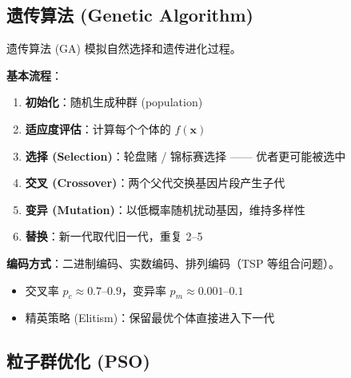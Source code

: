 \documentclass[11pt, aspectratio=169, svgnames, table, fontset=fandol]{ctexbeamer}
\begin{document}
\subsection{遗传算法 (Genetic Algorithm)}

\begin{frame}{遗传算法 (GA)}
  模拟自然选择和遗传进化过程。

  \vspace{4pt}
  \textbf{基本流程}：
  \begin{enumerate}
    \item \textbf{初始化}：随机生成种群 (population)
    \item \textbf{适应度评估}：计算每个个体的 $f(\bm{x})$
    \item \textbf{选择 (Selection)}：轮盘赌 / 锦标赛选择 —— 优者更可能被选中
    \item \textbf{交叉 (Crossover)}：两个父代交换基因片段产生子代
    \item \textbf{变异 (Mutation)}：以低概率随机扰动基因，维持多样性
    \item \textbf{替换}：新一代取代旧一代，重复 2--5
  \end{enumerate}

  \vspace{4pt}
  \textbf{编码方式}：二进制编码、实数编码、排列编码（TSP 等组合问题）。

  \begin{itemize}
    \item 交叉率 $p_c \approx 0.7\text{--}0.9$，变异率 $p_m \approx 0.001\text{--}0.1$
    \item 精英策略 (Elitism)：保留最优个体直接进入下一代
  \end{itemize}
\end{frame}

\subsection{粒子群优化 (PSO)}
\end{document}

